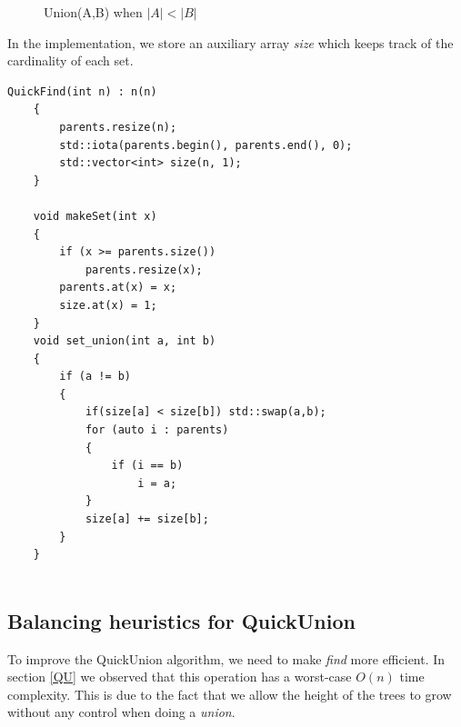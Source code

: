 \documentclass{article}
\begin{document}
\begin{figure}[h!]
    \centering
    \caption{Union(A,B) when $|A| < |B|$}
    \label{fig:qfsize}
\end{figure}
In the implementation, we store an auxiliary array \emph{size} which keeps track
of the cardinality of each set.
\begin{lstlisting}[caption=updated operations in QuickFind, label=lab:qfu]
    QuickFind(int n) : n(n)
    {
        parents.resize(n);
        std::iota(parents.begin(), parents.end(), 0);
        std::vector<int> size(n, 1);
    }

    void makeSet(int x)
    {
        if (x >= parents.size())
            parents.resize(x);
        parents.at(x) = x;
        size.at(x) = 1;
    }
    void set_union(int a, int b)
    {
        if (a != b)
        {
            if(size[a] < size[b]) std::swap(a,b);
            for (auto i : parents)
            {
                if (i == b)
                    i = a;
            }
            size[a] += size[b];
        }
    }
    
\end{lstlisting}
\subsection{Balancing heuristics for QuickUnion}
To improve the QuickUnion algorithm, we need to make \emph{find} more efficient.
In section \ref{QU} we observed that this operation has a worst-case $O(n)$ time complexity.
This is due to the fact that we allow the height of the trees to grow without any control when 
doing a \emph{union}. 
\end{document}
